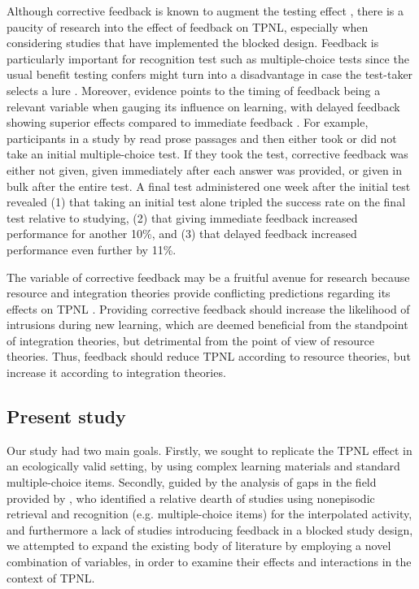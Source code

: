 \documentclass[../main.tex]{subfiles}
\begin{document}
Although corrective feedback is known to augment the testing effect \citep{roedigeriiiCriticalRoleRetrieval2011}, there is a paucity of research into the effect of feedback on TPNL, especially when considering studies that have implemented the  blocked design. Feedback is particularly important for recognition test such as multiple-choice tests since the usual benefit testing confers might turn into a disadvantage in case the test-taker selects a lure \citep{roedigerPositiveNegativeConsequences2005, marshMemorialConsequencesMultiplechoice2007}. Moreover, evidence points to the timing of feedback being a relevant variable when gauging its influence on learning, with delayed feedback showing superior effects compared to immediate feedback \citep{metcalfeDelayedImmediateFeedback2009,butlerEffectTypeTiming2007, butlerFeedbackEnhancesPositive2008,smithLearningFeedbackSpacing2010}. For example, participants in a study by \cite{butlerFeedbackEnhancesPositive2008} read prose passages and then either took or did not take an initial multiple-choice test. If they took the test, corrective feedback was either not given, given immediately after each answer was provided, or given in bulk after the entire test. A final test administered one week after the initial test revealed (1) that taking an initial test alone tripled the success rate on the final test relative to studying, (2) that giving immediate feedback increased performance for another 10\%, and (3) that delayed feedback increased performance even further by 11\%.

The variable of corrective feedback may be a fruitful avenue for research because resource and integration theories provide conflicting predictions regarding its effects on TPNL \citep{chanRetrievalPotentiatesNew2018}. Providing corrective feedback should increase the likelihood of intrusions during new learning, which are deemed beneficial from the standpoint of integration theories, but detrimental from the point of view of resource theories. Thus, feedback should reduce TPNL according to resource theories, but increase it according to integration theories.


\subsection{Present study\label{present}}

Our study had two main goals. Firstly, we sought to replicate the TPNL effect in
an ecologically valid setting, by using complex learning materials and standard
multiple-choice items. Secondly, guided by the analysis of gaps in the field
provided by \cite{chanRetrievalPotentiatesNew2018}, who identified a relative
dearth of studies using nonepisodic retrieval and recognition (e.g.
multiple-choice items) for the interpolated activity, and furthermore a lack of
studies introducing feedback in a blocked study design, we attempted to expand
the existing body of literature by employing a novel combination of variables,
in order to examine their effects and interactions in the context of TPNL.
\end{document}
